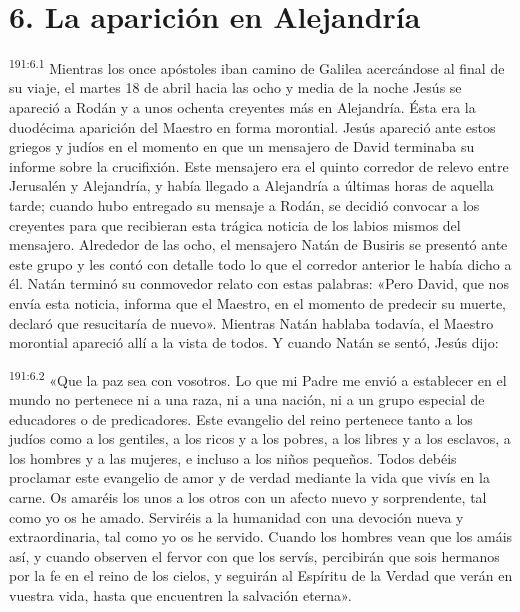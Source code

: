 \section*{6. La aparición en Alejandría}
\par
\textsuperscript{191:6.1} Mientras los once apóstoles iban camino de Galilea acercándose al final de su viaje, el martes 18 de abril hacia las ocho y media de la noche Jesús se apareció a Rodán y a unos ochenta creyentes más en Alejandría. Ésta era la duodécima aparición del Maestro en forma morontial. Jesús apareció ante estos griegos y judíos en el momento en que un mensajero de David terminaba su informe sobre la crucifixión. Este mensajero era el quinto corredor de relevo entre Jerusalén y Alejandría, y había llegado a Alejandría a últimas horas de aquella tarde; cuando hubo entregado su mensaje a Rodán, se decidió convocar a los creyentes para que recibieran esta trágica noticia de los labios mismos del mensajero. Alrededor de las ocho, el mensajero Natán de Busiris se presentó ante este grupo y les contó con detalle todo lo que el corredor anterior le había dicho a él. Natán terminó su conmovedor relato con estas palabras: «Pero David, que nos envía esta noticia, informa que el Maestro, en el momento de predecir su muerte, declaró que resucitaría de nuevo». Mientras Natán hablaba todavía, el Maestro morontial apareció allí a la vista de todos. Y cuando Natán se sentó, Jesús dijo:

\par
\textsuperscript{191:6.2} «Que la paz sea con vosotros. Lo que mi Padre me envió a establecer en el mundo no pertenece ni a una raza, ni a una nación, ni a un grupo especial de educadores o de predicadores. Este evangelio del reino pertenece tanto a los judíos como a los gentiles, a los ricos y a los pobres, a los libres y a los esclavos, a los hombres y a las mujeres, e incluso a los niños pequeños. Todos debéis proclamar este evangelio de amor y de verdad mediante la vida que vivís en la carne. Os amaréis los unos a los otros con un afecto nuevo y sorprendente, tal como yo os he amado. Serviréis a la humanidad con una devoción nueva y extraordinaria, tal como yo os he servido. Cuando los hombres vean que los amáis así, y cuando observen el fervor con que los servís, percibirán que sois hermanos por la fe en el reino de los cielos, y seguirán al Espíritu de la Verdad que verán en vuestra vida, hasta que encuentren la salvación eterna».

